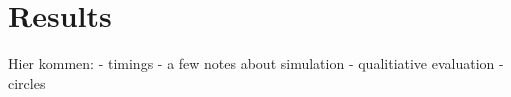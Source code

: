 \chapter{Results}
\label{sec:results}

Hier kommen:
- timings
- a few notes about simulation
- qualitiative evaluation
    - circles
